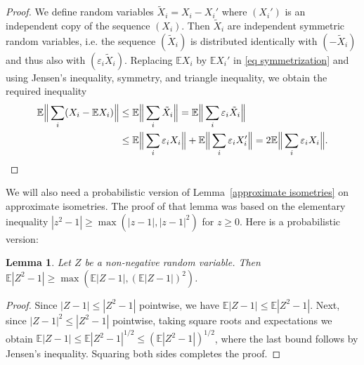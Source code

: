 \documentclass[10pt, openany]{book}
\newtheorem{lemma}[theorem]{Lemma}
\theoremstyle{remark}
\def \E {\mathbb{E}}
\def \e {\varepsilon}
\begin{document}
\begin{proof}
We define random variables $\tilde{X}_i = X_i - X_i'$ 
where $(X_i')$ is an independent copy of the sequence
$(X_i)$. 
Then $\tilde{X}_i$ are independent symmetric random variables, i.e. the sequence 
$(\tilde{X}_i)$ is distributed
identically with $(-\tilde{X}_i)$ and thus also with $(\e_i \tilde{X}_i)$.
Replacing $\E X_i$ by $\E X_i'$ in \eqref{eq symmetrization} and using 
Jensen's inequality, symmetry, and triangle inequality, we obtain the required inequality
\begin{align*}
\E \Big\| \sum_i (X_i - \E X_i) \Big\|
  &\le \E \Big\| \sum_i \tilde{X}_i \Big\| 
  = \E \Big\| \sum_i \e_i \tilde{X}_i \Big\| \\
  &\le \E \Big\| \sum_i \e_i X_i \Big\| + \E \Big\| \sum_i \e_i X_i' \Big\| 
  = 2 \E \Big\| \sum_i \e_i X_i \Big\|. 	\qedhere
\end{align*}
\end{proof}


We will also need a probabilistic version of Lemma~\ref{approximate isometries} on approximate isometries.
The proof of that lemma was based on the elementary inequality
$|z^2-1| \ge \max( |z-1|, |z-1|^2 )$ for $z \ge 0$. Here is a probabilistic version:

\begin{lemma}				\label{deviation from 1}
  Let $Z$ be a non-negative random variable. 
  Then $\E|Z^2-1| \ge \max( \E|Z-1|, (\E|Z-1|)^2 )$.
\end{lemma}

\begin{proof}
Since $|Z-1| \le |Z^2-1|$ pointwise, we have $\E |Z-1| \le \E |Z^2-1|$.
Next, since $|Z-1|^2 \le |Z^2-1|$ pointwise,  
taking square roots and expectations we obtain
$\E|Z-1| \le \E|Z^2-1|^{1/2} \le (\E|Z^2-1|)^{1/2}$, where the last bound follows by Jensen's inequality.
Squaring both sides 
completes the proof.
\end{proof}
\end{document}

